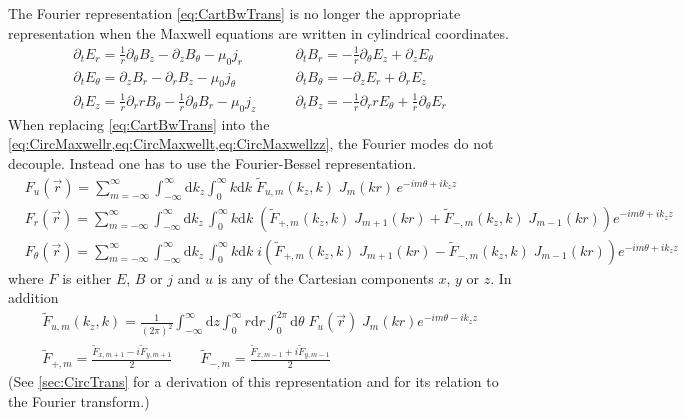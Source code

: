\documentclass[a4paper]{article}   	%
\newcommand{\ir}{\frac{1}{r}}
\newcommand{\Integ}[1]{\int_{-\infty}^{\infty} \!\!\!\!\!
  \mathrm{d}#1}
\newcommand{\RInteg}[1]{\int_{0}^{\infty} \!\!\!\!\! #1\mathrm{d}#1}
\newcommand{\TInteg}[1]{\int_{0}^{2\pi} \!\!\!\!\! \mathrm{d}#1}
\begin{document}
The Fourier representation \cref{eq:CartBwTrans} is no longer the
appropriate representation when the Maxwell equations are written in cylindrical coordinates.
\begin{align}
\partial_t E_r = \ir \partial_\theta B_z - \partial_z B_\theta - \mu_0  j_r \qquad&   
\partial_t B_r = -\ir \partial_\theta E_z + \partial_z E_\theta \label{eq:CircMaxwellr} \\
\partial_t E_\theta = \partial_z B_r - \partial_r B_z - \mu_0  j_\theta \qquad &   
\partial_t B_\theta = -\partial_z E_r + \partial_r E_z \label{eq:CircMaxwellt}  \\
\partial_t E_z = \ir\partial_r r B_\theta - \ir\partial_\theta B_r - \mu_0  j_z \qquad &   
\partial_t B_z = -\ir\partial_r r E_\theta + \ir\partial_\theta E_r \label{eq:CircMaxwellzz} 
\end{align}
When replacing
\cref{eq:CartBwTrans} into the \cref{eq:CircMaxwellr,eq:CircMaxwellt,eq:CircMaxwellzz}, the Fourier modes do not decouple. Instead one has to use the Fourier-Bessel representation.
\begin{align}
& F_u(\vec{r}) = \sum_{m=-\infty}^{\infty} \Integ{k_z}
\RInteg{k}\; \tilde{F}_{u,m}(k_z,k) \; J_m(kr)\, e^{-im\theta + ik_z z} 
\label{eq:CircBwTransu} \\
& F_r(\vec{r}) = \sum_{m=-\infty}^{\infty} \Integ{k_z}\,\RInteg{k}\;
\left( \tilde{F}_{+,m}(k_z,k)\; J_{m+1}(kr) +\tilde{F}_{-,m}(k_z,k)\; J_{m-1}(kr)
\right)  e^{-im\theta +ik_z z}
\label{eq:CircBwTransr} \\
& F_\theta(\vec{r}) = \sum_{m=-\infty}^{\infty} \Integ{k_z}\,\RInteg{k}\;
i\left( \tilde{F}_{+,m}(k_z,k)\; J_{m+1}(kr) - \tilde{F}_{-,m}(k_z,k)\; J_{m-1}(kr)
\right)  e^{-im\theta +ik_z z} 
\label{eq:CircBwTranst}
\end{align}
where $F$ is either $E$, $B$ or $j$ and $u$ is any of the
Cartesian components $x$, $y$ or $z$. In addition
\begin{align}
\tilde{F}_{u,m}(k_z,k) = \frac{1}{(2\pi)^2} \Integ{z} \RInteg{r}
\TInteg{\theta} \;F_u(\vec{r})\; J_m(kr) e^{-im\theta
 - i k_z z} \label{eq:CircFwTransu} \\
\tilde{F}_{+,m} = \frac{\tilde{F}_{x,m+1} -
    i\tilde{F}_{y,m+1}}{2} \qquad \tilde{F}_{-,m} = \frac{\tilde{F}_{x,m-1} +
    i\tilde{F}_{y,m-1}}{2}
\label{eq:CircFwTranspm} 
\end{align}
\noindent (See \cref{sec:CircTrans} for a derivation of this representation and
 for its relation to the Fourier transform.)
\end{document}
